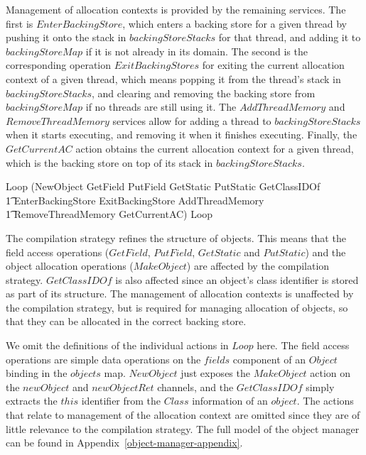 Management of allocation contexts is provided by the remaining
services.
The first is $EnterBackingStore$, which enters a backing store for a
given thread by pushing it onto the stack in $backingStoreStacks$ for
that thread, and adding it to $backingStoreMap$ if it is not already
in its domain.
The second is the corresponding operation $ExitBackingStores$ for
exiting the current allocation context of a given thread, which means
popping it from the thread's stack in $backingStoreStacks$, and
clearing and removing the backing store from $backingStoreMap$ if no
threads are still using it.
The $AddThreadMemory$ and $RemoveThreadMemory$ services allow for
adding a thread to $backingStoreStacks$ when it starts executing, and
removing it when it finishes executing.
Finally, the $GetCurrentAC$ action obtains the current allocation
context for a given thread, which is the backing store on top of its
stack in $backingStoreStacks$.
\begin{circusaction}
  Loop \circdef (NewObject \extchoice GetField \extchoice PutField \extchoice GetStatic \extchoice PutStatic \extchoice GetClassIDOf \\
  \t1 {} \extchoice EnterBackingStore \extchoice ExitBackingStore \extchoice AddThreadMemory \\
  \t1 {} \extchoice RemoveThreadMemory \extchoice GetCurrentAC)
  \circseq Loop
\end{circusaction}

The compilation strategy refines the structure of objects.
This means that the field access operations ($GetField$, $PutField$,
$GetStatic$ and $PutStatic$) and the object allocation operations
($MakeObject$) are affected by the compilation strategy.
$GetClassIDOf$ is also affected since an object's class identifier is
stored as part of its structure.
The management of allocation contexts is unaffected by the compilation
strategy, but is required for managing allocation of objects, so that
they can be allocated in the correct backing store.

We omit the definitions of the individual actions in $Loop$ here. 
The field access operations are simple data operations on the $fields$
component of an $Object$ binding in the $objects$ map.
$NewObject$ just exposes the $MakeObject$ action on the $newObject$
and $newObjectRet$ channels, and the $GetClassIDOf$ simply extracts
the $this$ identifier from the $Class$ information of an $object$.
The actions that relate to management of the allocation context are
omitted since they are of little relevance to the compilation
strategy.
The full model of the object manager can be found in
Appendix~\ref{object-manager-appendix}.

